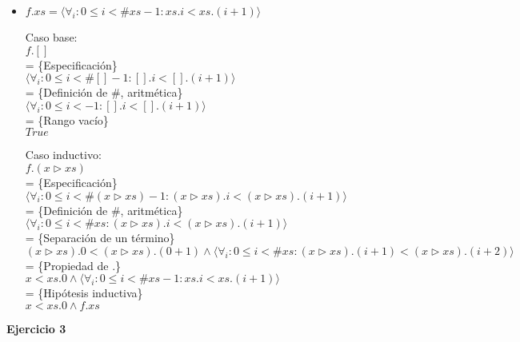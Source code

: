 \documentclass[12pt]{article}
\begin{document}
\begin{itemize}
    \item $ f.xs = \langle \forall_i : 0 \le i < \#xs - 1 : xs.i < xs.(i + 1) \rangle $

    \bigbreak

    Caso base:\\
    $ f.[] $\\
    = \{Especificación\}\\
    $ \langle \forall_i : 0 \le i < \#[] - 1 : [].i < [].(i + 1) \rangle $\\
    = \{Definición de \#, aritmética\}\\
    $ \langle \forall_i : 0 \le i < -1 : [].i < [].(i + 1) \rangle $\\
    = \{Rango vacío\}\\
    $ True $

    \bigbreak

    Caso inductivo:\\
    $ f.(x \triangleright xs ) $\\
    = \{Especificación\}\\
    $ \langle \forall_i : 0 \le i < \#(x \triangleright xs ) - 1 : (x \triangleright xs ).i < (x \triangleright xs ).(i + 1) \rangle $\\
    = \{Definición de \#, aritmética\}\\
    $ \langle \forall_i : 0 \le i < \#xs : (x \triangleright xs ).i < (x \triangleright xs ).(i + 1) \rangle $\\
    = \{Separación de un término\}\\
    $ (x \triangleright xs ).0 < (x \triangleright xs ).(0 + 1) \land \langle \forall_i : 0 \le i < \#xs : (x \triangleright xs ).(i + 1) < (x \triangleright xs ).(i + 2) \rangle $\\
    = \{Propiedad de .\}\\
    $ x < xs.0 \land \langle \forall_i : 0 \le i < \#xs - 1 : xs.i < xs.(i + 1) \rangle $\\
    = \{Hipótesis inductiva\}\\
    $ x < xs.0 \land f.xs $

\end{itemize}

\bigbreak

\textbf{Ejercicio 3}
\end{document}
